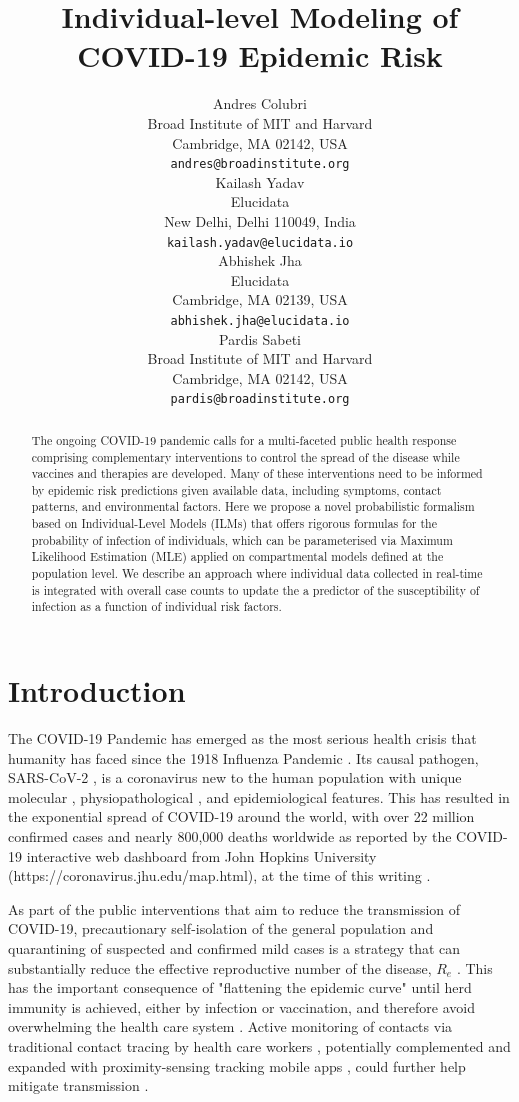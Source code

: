 \documentclass{article}
\title{Individual-level Modeling of COVID-19 Epidemic Risk}
\author{
 Andres Colubri \\
  Broad Institute of MIT and Harvard\\
  Cambridge, MA 02142, USA \\
  \texttt{andres@broadinstitute.org} \\
  \And
 Kailash Yadav \\
  Elucidata\\
  New Delhi, Delhi 110049, India \\
  \texttt{kailash.yadav@elucidata.io} \\
  \And  
 Abhishek Jha \\
  Elucidata\\
  Cambridge, MA 02139, USA \\
  \texttt{abhishek.jha@elucidata.io} \\  
   \And
   Pardis Sabeti \\
   Broad Institute of MIT and Harvard\\
   Cambridge, MA 02142, USA \\
   \texttt{pardis@broadinstitute.org} \\
}
\begin{document}
\maketitle

\begin{abstract}
The ongoing COVID-19 pandemic calls for a multi-faceted public health response comprising complementary interventions to control the spread of the disease while vaccines and therapies are developed. Many of these interventions need to be informed by epidemic risk predictions given available data, including symptoms, contact patterns, and environmental factors. Here we propose a novel probabilistic formalism based on Individual-Level Models (ILMs) that offers rigorous formulas for the probability of infection of individuals, which can be parameterised via Maximum Likelihood Estimation (MLE) applied on compartmental models defined at the population level. We describe an approach where individual data collected in real-time is integrated with overall case counts to update the a predictor of the susceptibility of infection as a function of individual risk factors.
\end{abstract}




\section{Introduction}
The COVID-19 Pandemic \cite{Velavan2020, Fauci2020} has emerged as the most serious health crisis that humanity has faced since the 1918 Influenza Pandemic \cite{Viboud2018}. Its causal pathogen, SARS-CoV-2 \cite{Lu2020}, is a coronavirus new to the human population with unique molecular \cite{Wrapp2020}, physiopathological \cite{Zou2020}, and epidemiological \cite{Liu2020} features. This has resulted in the exponential spread of COVID-19 around the world, with over 22 million confirmed cases and nearly 800,000 deaths worldwide as reported by the COVID-19 interactive web dashboard from John Hopkins University (https://coronavirus.jhu.edu/map.html), at the time of this writing \cite{Dong2020}.

As part of the public interventions that aim to reduce the transmission of COVID-19, precautionary self-isolation of the general population and quarantining of suspected and confirmed mild cases is a strategy that can substantially reduce the effective reproductive number of the disease, $R_e$ \cite{Wang2020}. This has the important consequence of "flattening the epidemic curve" until herd immunity is achieved, either by infection or vaccination, and therefore avoid overwhelming the health care system \cite{Kissler2020}. Active monitoring of contacts via traditional contact tracing by health care workers \cite{eames2003}, potentially complemented and expanded with proximity-sensing tracking mobile apps \cite{Ferretti2020}, could further help mitigate transmission \cite{Peak2020}.
\end{document}
